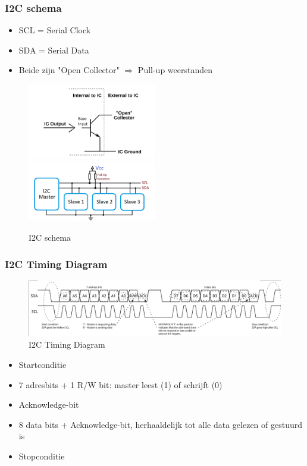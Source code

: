 \documentclass{article}
\begin{document}
\subsubsection{I2C schema}
\begin{itemize}
    \item SCL = Serial Clock
    \item SDA = Serial Data
    \item Beide zijn "Open Collector" $\Rightarrow$ Pull-up weerstanden
\end{itemize}

\begin{figure}[H]
    \centering
    \centerline{
        \includegraphics[width=0.5\textwidth]{Screenshot_20200330_120948.png}
        \includegraphics[width=0.5\textwidth]{Screenshot_20200330_114601.png}
    }
    \caption{I2C schema}
\end{figure}


\subsubsection{I2C Timing Diagram}

\begin{figure}[H]
    \centering
    \includegraphics[width=\textwidth]{Screenshot_20200330_114819.png}
    \caption{I2C Timing Diagram}
\end{figure}

\begin{itemize}
    \item Startconditie
    \item 7 adresbits + 1 R/W bit: master leest (1) of schrijft (0)
    \item Acknowledge-bit
    \item 8 data bits + Acknowledge-bit, herhaaldelijk tot alle data gelezen of gestuurd is
    \item Stopconditie
\end{itemize}
\end{document}
